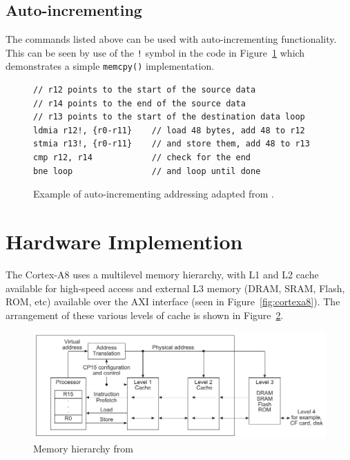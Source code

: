 \documentclass[oneside,a4paper]{report}
\begin{document}
\subsection{Auto-incrementing}
The commands listed above can be used with auto-incrementing functionality. This can be seen by use of the \texttt{!} symbol in the code in Figure~\ref{fig:autoincrement} which demonstrates a simple \texttt{memcpy()} implementation.

\begin{figure}[htb]
	\centering
	\begin{lstlisting}[language={[ARM]Assembler}]
// r12 points to the start of the source data
// r14 points to the end of the source data
// r13 points to the start of the destination data loop
ldmia r12!, {r0-r11}    // load 48 bytes, add 48 to r12
stmia r13!, {r0-r11}    // and store them, add 48 to r13
cmp r12, r14            // check for the end
bne loop                // and loop until done
	\end{lstlisting}
	\caption{Example of auto-incrementing addressing adapted from \cite[p. 61]{ARMInst}.}
	\label{fig:autoincrement}
\end{figure}

\section{Hardware Implemention}

The Cortex-A8 uses a multilevel memory hierarchy, with L1 and L2 cache available for high-speed access and external L3 memory (DRAM, SRAM, Flash, ROM, etc) available over the AXI interface (seen in Figure~\ref{fig:cortexa8}). The arrangement of these various levels of cache is shown in Figure~\ref{fig:memoryhierarchy}.

\begin{figure}[hb]
	\centering
	\includegraphics[width=1.0\textwidth]{./fig/MemoryHierarchy.pdf}
	\caption{Memory hierarchy from \cite[p. A3-52]{ARMRef}}
	\label{fig:memoryhierarchy}
\end{figure}
\end{document}
